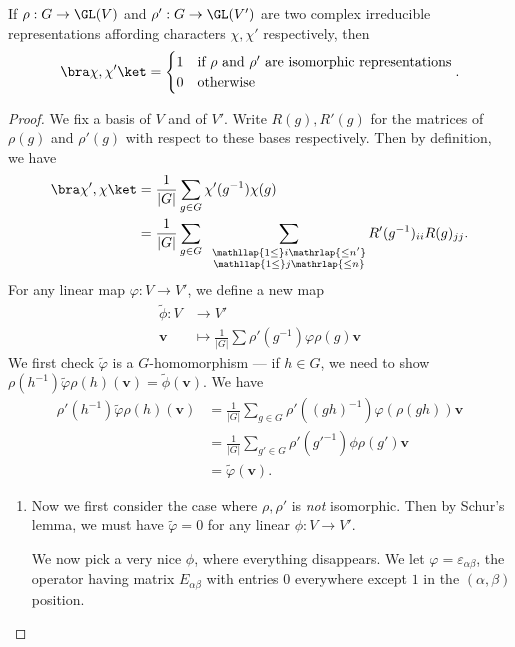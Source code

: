 \documentclass[a4paper]{article}
\begin{document}
\begin{thm}
  If $\rho: G \to \GL(V)$ and $\rho': G \to \GL(V')$ are two complex irreducible representations affording characters $\chi, \chi'$ respectively, then
  \[
    \bra \chi, \chi'\ket =
    \begin{cases}
      1 & \text{if $\rho$ and $\rho'$ are isomorphic representations}\\
      0 & \text{otherwise}
    \end{cases}.
  \]
\end{thm}

\begin{proof}
  We fix a basis of $V$ and of $V'$. Write $R(g), R'(g)$ for the matrices of $\rho(g)$ and $\rho'(g)$ with respect to these bases respectively. Then by definition, we have
  \begin{align*}
    \bra \chi', \chi\ket &= \frac{1}{|G|} \sum_{g \in G} \chi'(g^{-1}) \chi(g)\\
    &= \frac{1}{|G|} \sum_{g \in G}\;\;\sum_{\substack{\mathllap{1 \leq}i\mathrlap{\leq n'}\\ \mathllap{1\leq}j\mathrlap{\leq n}}}R'(g^{-1})_{ii} R(g)_{jj}.
  \end{align*}
  For any linear map $\varphi: V \to V'$, we define a new map
  \begin{align*}
    \tilde{\phi}: V &\to V'\\
    \mathbf{v} &\mapsto \frac{1}{|G|} \sum \rho'(g^{-1}) \varphi \rho(g) \mathbf{v}
  \end{align*}
  We first check $\tilde{\varphi}$ is a $G$-homomorphism --- if $h \in G$, we need to show $\rho(h^{-1}) \tilde{\varphi} \rho(h) (\mathbf{v}) = \tilde{\phi}(\mathbf{v})$. We have
  \begin{align*}
    \rho'(h^{-1})\tilde{\varphi}\rho(h) (\mathbf{v}) &= \frac{1}{|G|} \sum_{g \in G} \rho'((gh)^{-1})\varphi(\rho(gh))\mathbf{v}\\
    &= \frac{1}{|G|} \sum_{g' \in G} \rho'(g'^{-1}) \phi \rho(g') \mathbf{v}\\
    &= \tilde{\varphi}(\mathbf{v}).
  \end{align*}
  \begin{enumerate}
    \item Now we first consider the case where $\rho, \rho'$ is \emph{not} isomorphic. Then by Schur's lemma, we must have $\tilde{\varphi} = 0$ for any linear $\phi: V \to V'$.

      We now pick a very nice $\phi$, where everything disappears. We let $\varphi = \varepsilon_{\alpha\beta}$, the operator having matrix $E_{\alpha\beta}$ with entries $0$ everywhere except $1$ in the $(\alpha,\beta)$ position.


\end{enumerate}
\end{proof}
\end{document}
